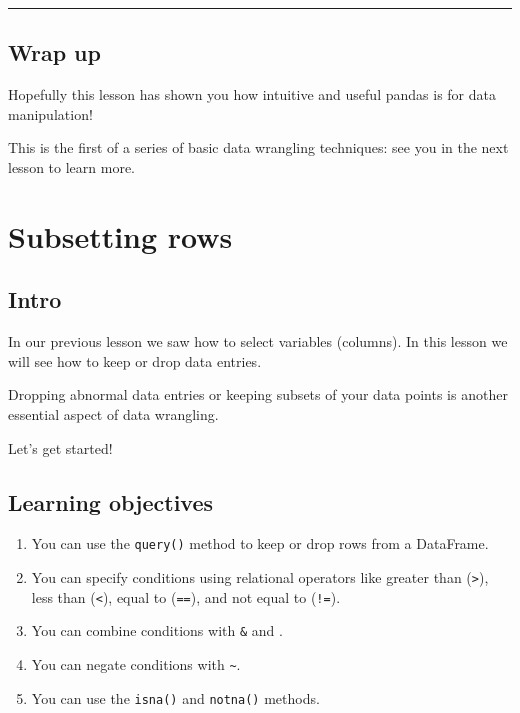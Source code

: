 \documentclass[
  letterpaper,
  DIV=11,
  numbers=noendperiod]{scrreprt}
\providecommand{\tightlist}{%
  \setlength{\itemsep}{0pt}\setlength{\parskip}{0pt}}\usepackage{longtable,booktabs,array}
\begin{document}
\begin{center}\rule{0.5\linewidth}{0.5pt}\end{center}

\section{Wrap up}\label{wrap-up-4}

Hopefully this lesson has shown you how intuitive and useful pandas is
for data manipulation!

This is the first of a series of basic data wrangling techniques: see
you in the next lesson to learn more.

\chapter{Subsetting rows}\label{subsetting-rows}

\section{Intro}\label{intro-2}

In our previous lesson we saw how to select variables (columns). In this
lesson we will see how to keep or drop data entries.

Dropping abnormal data entries or keeping subsets of your data points is
another essential aspect of data wrangling.

Let's get started!

\section{Learning objectives}\label{learning-objectives-8}

\begin{enumerate}
\def\labelenumi{\arabic{enumi}.}
\tightlist
\item
  You can use the \texttt{query()} method to keep or drop rows from a
  DataFrame.
\item
  You can specify conditions using relational operators like greater
  than (\texttt{\textgreater{}}), less than (\texttt{\textless{}}),
  equal to (\texttt{==}), and not equal to (\texttt{!=}).
\item
  You can combine conditions with \texttt{\&} and \texttt{\textbar{}}.
\item
  You can negate conditions with \texttt{\textasciitilde{}}.
\item
  You can use the \texttt{isna()} and \texttt{notna()} methods.
\end{enumerate}
\end{document}
